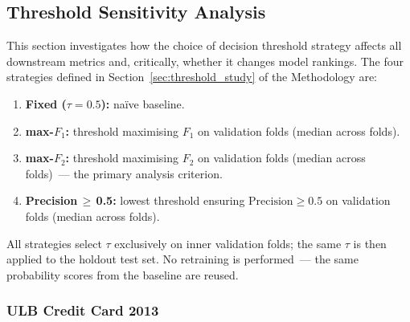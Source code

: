 
\subsection{Threshold Sensitivity Analysis}
\label{sec:threshold_sensitivity}

This section investigates how the choice of decision threshold strategy
affects all downstream metrics and, critically, whether it changes model rankings.
The four strategies defined in Section~\ref{sec:threshold_study} of the Methodology are:
\begin{enumerate}
  \item \textbf{Fixed ($\tau=0.5$):} na\"ive baseline.
  \item \textbf{max-$F_1$:} threshold maximising $F_1$ on validation folds (median across folds).
  \item \textbf{max-$F_2$:} threshold maximising $F_2$ on validation folds (median across folds)~--- the primary analysis criterion.
  \item \textbf{Precision\,$\geq$\,0.5:} lowest threshold ensuring $\text{Precision} \geq 0.5$ on validation folds (median across folds).
\end{enumerate}

All strategies select $\tau$ exclusively on inner validation folds;
the same $\tau$ is then applied to the holdout test set.
No retraining is performed~--- the same probability scores from the baseline are reused.


\subsubsection{ULB Credit Card 2013}

